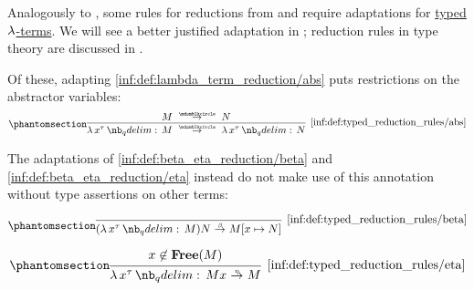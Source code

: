\begin{definition}\label{def:typed_reduction_rules}
  Analogously to , some rules for reductions from  and  require adaptations for \hyperref[def:typed_lambda_term]{typed \( \mathrm{\lambda} \)-terms}. We will see a better justified adaptation in ; reduction rules in type theory are discussed in .

  Of these, adapting \ref{inf:def:lambda_term_reduction/abs} puts restrictions on the abstractor variables:
  \begin{equation*}\taglabel[\ensuremath{ \logic{Abs}_{\Anon}^{\T{tt}} }]{inf:def:typed_reduction_rules/abs}
    \begin{prooftree}
      \hypo{ M \pred N }
      \infer1[\ref{inf:def:typed_reduction_rules/abs}]{ \qabs {x^\tau} M \pred \qabs {x^\tau} N }.
    \end{prooftree}
  \end{equation*}

  The adaptations of \ref{inf:def:beta_eta_reduction/beta} and \ref{inf:def:beta_eta_reduction/eta} instead do not make use of this annotation without type assertions on other terms:
  \begin{paracol}{2}
    \begin{leftcolumn}
      \ParacolAlignmentHack
      \begin{equation*}\taglabel[\ensuremath{ \logic{Red}_\beta^{\T{tt}} }]{inf:def:typed_reduction_rules/beta}
        \begin{prooftree}
          \infer0[\ref{inf:def:typed_reduction_rules/beta}]{ (\qabs {x^\tau} M) N \bred M[x \mapsto N] }.
        \end{prooftree}
      \end{equation*}
    \end{leftcolumn}

    \begin{rightcolumn}
      \ParacolAlignmentHack
      \begin{equation*}\taglabel[\ensuremath{ \logic{Red}_\eta^{\T{tt}} }]{inf:def:typed_reduction_rules/eta}
        \begin{prooftree}
          \hypo{ x \not\in \op*{Free}(M) }
          \infer1[\ref{inf:def:typed_reduction_rules/eta}]{ \qabs {x^\tau} M x \ered M }.
        \end{prooftree}
      \end{equation*}
    \end{rightcolumn}
  \end{paracol}
\end{definition}

